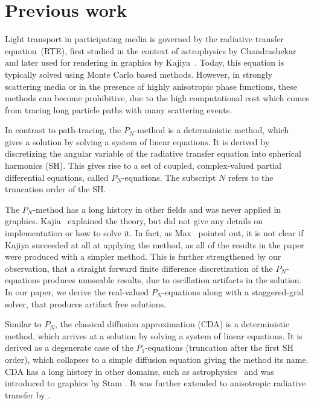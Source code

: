 

\section{Previous work}

Light transport in participating media is governed by the radiative transfer equation~(RTE), first studied in the context of astrophysics by Chandrashekar~\cite{Chandrasekhar60} and later used for rendering in graphics by Kajiya~\cite{Kajiya86}. Today, this equation is typically solved using Monte Carlo based methods. However, in strongly scattering media or in the presence of highly anisotropic phase functions, these methods can become prohibitive, due to the high computational cost which comes from tracing long particle paths with many scattering events.

In contrast to path-tracing, the $P_N$-method is a deterministic method, which gives a solution by solving a system of linear equations. It is derived by discretizing the angular variable of the radiative transfer equation into spherical harmonics (SH). This gives rise to a set of coupled, complex-valued partial differential equations, called $P_N$-equations. The subscript $N$ refers to the truncation order of the SH. 

The $P_N$-method has a long history in other fields and was never applied in graphics. Kajia~\cite{Kajiya84} explained the theory, but did not give any details on implementation or how to solve it. In fact, as Max~\cite{Max95} pointed out, it is not clear if Kajiya succeeded at all at applying the method, as all of the results in the paper were produced with a simpler method. This is further strengthened by our observation, that a straight forward finite difference discretization of the $P_N$-equations produces unuseable results, due to oscillation artifacts in the solution. In our paper, we derive the real-valued $P_N$-equations along with a staggered-grid solver, that produces artifact free solutions.

Similar to $P_N$, the classical diffusion approximation (CDA) is a deterministic method, which arrives at a solution by solving a system of linear equations. It is derived as a degenerate case of the $P_1$-equations (truncation after the first SH order), which collapses to a simple diffusion equation giving the method its name. CDA has a long history in other domains, such as astrophysics~\cite{Ishimaru78} and was introduced to graphics by Stam \cite{Stam95}. It was further extended to anisotropic radiative transfer by \cite{Jakob10}.

